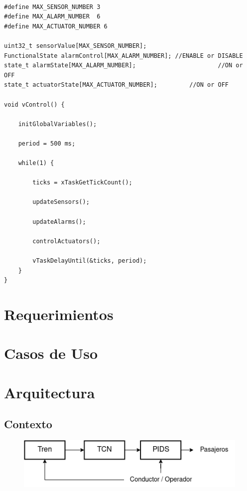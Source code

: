 \begin{lstlisting}[label=cod:vControl,caption=Pseudocódigo del lazo principal de control.]  % Start your code-block

#define MAX_SENSOR_NUMBER 3
#define MAX_ALARM_NUMBER  6
#define MAX_ACTUATOR_NUMBER 6

uint32_t sensorValue[MAX_SENSOR_NUMBER];		
FunctionalState alarmControl[MAX_ALARM_NUMBER];	//ENABLE or DISABLE
state_t alarmState[MAX_ALARM_NUMBER];						//ON or OFF
state_t actuatorState[MAX_ACTUATOR_NUMBER];			//ON or OFF

void vControl() {

	initGlobalVariables();
	
	period = 500 ms;
		
	while(1) {

		ticks = xTaskGetTickCount();
		
		updateSensors();
		
		updateAlarms();
		
		controlActuators();
		
		vTaskDelayUntil(&ticks, period);
	}
}
\end{lstlisting}



\section{Requerimientos}

\pagebreak
\section{Casos de Uso}

\pagebreak

\section{Arquitectura}

\subsection{Contexto}
\begin{figure}[ht]
	\centering
	\includegraphics[width=1\textwidth]{./Figures/diagTrenTcnPids.png}
	\caption{}
	\label{fig:diagTrenTcnPids}
\end{figure}

